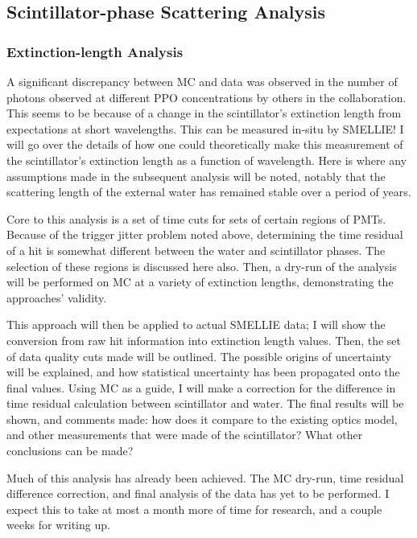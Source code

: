 \subsection{Scintillator-phase Scattering Analysis}
\subsubsection{Extinction-length Analysis}
A significant discrepancy between MC and data was observed in the number of photons observed at different PPO concentrations by others in the collaboration. This seems to be because of a change in the scintillator's extinction length from expectations at short wavelengths. This can be measured in-situ by SMELLIE! I will go over the details of how one could theoretically make this measurement of the scintillator's extinction length as a function of wavelength. Here is where any assumptions made in the subsequent analysis will be noted, notably that the scattering length of the external water has remained stable over a period of years.

Core to this analysis is a set of time cuts for sets of certain regions of PMTs. Because of the trigger jitter problem noted above, determining the time residual of a hit is somewhat different between the water and scintillator phases. The selection of these regions is discussed here also. Then, a dry-run of the analysis will be performed on MC at a variety of extinction lengths, demonstrating the approaches' validity.

This approach will then be applied to actual SMELLIE data; I will show the conversion from raw hit information into extinction length values. Then, the set of data quality cuts made will be outlined. The possible origins of uncertainty will be explained, and how statistical uncertainty has been propagated onto the final values. Using MC as a guide, I will make a correction for the difference in time residual calculation between scintillator and water. The final results will be shown, and comments made: how does it compare to the existing optics model, and other measurements that were made of the scintillator? What other conclusions can be made?

Much of this analysis has already been achieved. The MC dry-run, time residual difference correction, and final analysis of the data has yet to be performed. I expect this to take at most a month more of time for research, and a couple weeks for writing up.

